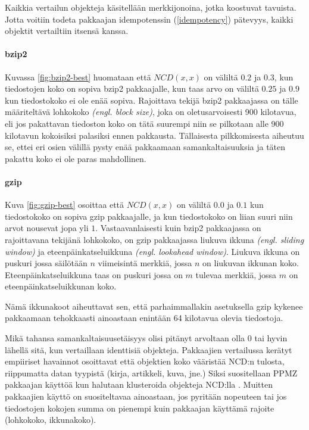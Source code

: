 \documentclass[12pt,finnish]{tktltiki2}
\theoremstyle{definition}
\theoremstyle{remark}
\newcommand{\engl}[1]{\emph{(engl. #1)}}
\begin{document}
      Kaikkia vertailun objekteja käsitellään merkkijonoina, jotka koostuvat tavuista.
      Jotta voitiin todeta pakkaajan idempotenssin (\ref{idempotency}) pätevyys, kaikki objektit vertailtiin itsensä kanssa.

      \paragraph{bzip2} %
      \label{par:bzip2}
        Kuvassa \ref{fig:bzip2-best} huomataan että $NCD(x,x)$ on väliltä $0.2$ ja $0.3$, kun tiedostojen koko on sopiva bzip2 pakkaajalle, kun taas arvo on väliltä $0.25$ ja $0.9$ kun tiedostokoko ei ole enää sopiva.
        Rajoittava tekijä bzip2 pakkaajassa on tälle määriteltävä lohkokoko \engl{block size}, joka on oletusarvoisesti 900 kilotavua, eli jos pakattavan tiedoston koko on tätä suurempi niin se pilkotaan alle 900 kilotavun kokoisiksi palasiksi ennen pakkausta.
        Tällaisesta pilkkomisesta aiheutuu se, ettei eri osien välillä pysty enää pakkaamaan samankaltaisuuksia ja täten pakattu koko ei ole paras mahdollinen.

      \paragraph{gzip} %
      \label{par:gzip}
        Kuva \ref{fig:gzip-best} osoittaa että $NCD(x,x)$ on väliltä $0.0$ ja $0.1$ kun tiedostokoko on sopiva gzip pakkaajalle, ja kun tiedostokoko on liian suuri niin arvot nousevat jopa yli $1$.
        Vastaavanlaisesti kuin bzip2 pakkaajassa on rajoittavana tekijänä lohkokoko, on gzip pakkaajassa liukuva ikkuna \engl{sliding window} ja eteenpäinkatseluikkuna \engl{lookahead window}.
        Liukuva ikkuna on puskuri jossa säilötään $n$ viimeisintä merkkiä, jossa $n$ on liukuvan ikkunan koko.
        Eteenpäinkatseluikkuna taas on puskuri jossa on $m$ tulevaa merkkiä, jossa $m$ on eteenpäinkatseluikkunan koko.

        Nämä ikkunakoot aiheuttavat sen, että parhaimmallakin asetuksella gzip kykenee pakkaamaan tehokkaasti ainoastaan enintään 64 kilotavua olevia tiedostoja.

      Mikä tahansa samankaltaisuusetäisyys olisi pitänyt arvoltaan olla $0$ tai hyvin lähellä sitä, kun vertaillaan identtisiä objekteja.
      Pakkaajien vertailussa kerätyt empiiriset havainnot osoittavat että objektien koko vääristää NCD:n tulosta, riippumatta datan tyypistä (kirja, artikkeli, kuva, jne.)
      Siksi suositellaan PPMZ pakkaajan käyttöä kun halutaan klusteroida objekteja NCD:lla \cite{cebrian2005common}.
      Muitten pakkaajien käyttö on suositeltavaa ainoastaan, jos pyritään nopeuteen tai jos tiedostojen kokojen summa on pienempi kuin pakkaajan käyttämä rajoite (lohkokoko, ikkunakoko).
\end{document}
